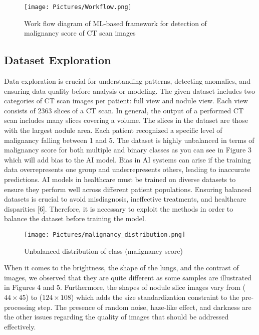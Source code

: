 \documentclass[a4paper, twocolumn, 11pt]{article}
\begin{document}
\begin{figure}[h!]
    \centering
    \texttt{[image: Pictures/Workflow.png]}
    \caption{Work flow diagram of ML-based framework for detection of malignancy score of CT scan images}
    \label{fig:Figure 1}
\end{figure}

\subsection{Dataset Exploration}
Data exploration is crucial for understanding patterns, detecting anomalies, and ensuring data quality before analysis or modeling. The given dataset includes two categories of CT scan images per patient: full view and nodule view. Each view consists of 2363 slices of a CT scan. In general, the output of a performed CT scan includes many slices covering a volume. The slices in the dataset are those with the largest nodule area. Each patient recognized a specific level of malignancy falling between 1 and 5. The dataset is highly unbalanced in terms of malignancy score for both multiple and binary classes as you can see in Figure 3 which will add bias to the AI model. Bias in AI systems can arise if the training data overrepresents one group and underrepresents others, leading to inaccurate predictions. AI models in healthcare must be trained on diverse datasets to ensure they perform well across different patient populations. Ensuring balanced datasets is crucial to avoid misdiagnosis, ineffective treatments, and healthcare disparities [6]. Therefore, it is necessary to exploit the methods in order to balance the dataset before training the model.

\begin{figure}[h!] %
    \centering
    \texttt{[image: Pictures/malignancy\_distribution.png]}
    \caption{Unbalanced distribution of class (malignancy score)}
    \label{fig:Figure 3}
\end{figure}

When it comes to the brightness, the shape of the lungs, and the contrast of images, we observed that they are quite different as some samples are illustrated in Figures 4 and 5. Furthermore, the shapes of nodule slice images vary from ($44 \times 45$) to ($124 \times 108$) which adds the size standardization constraint to the pre-processing step. The presence of random noise, haze-like effect, and darkness are the other issues regarding the quality of images that should be addressed effectively.
\end{document}
